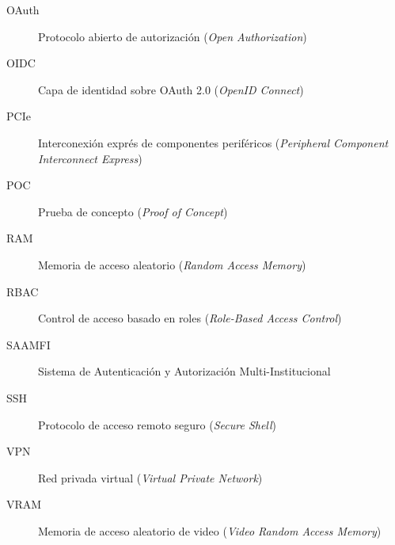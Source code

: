 \documentclass[letterpaper,11pt]{report}
\begin{document}
\begin{description}
  \item[OAuth] Protocolo abierto de autorización (\emph{Open Authorization})
  \item[OIDC] Capa de identidad sobre OAuth 2.0 (\emph{OpenID Connect})
  \item[PCIe] Interconexión exprés de componentes periféricos (\emph{Peripheral Component Interconnect Express})
  \item[POC] Prueba de concepto (\emph{Proof of Concept})
  \item[RAM] Memoria de acceso aleatorio (\emph{Random Access Memory})
  \item[RBAC] Control de acceso basado en roles (\emph{Role-Based Access Control})
  \item[SAAMFI] Sistema de Autenticación y Autorización Multi-Institucional
  \item[SSH] Protocolo de acceso remoto seguro (\emph{Secure Shell})
  \item[VPN] Red privada virtual (\emph{Virtual Private Network})
  \item[VRAM] Memoria de acceso aleatorio de video (\emph{Video Random Access Memory})
\end{description}

\end{document}
